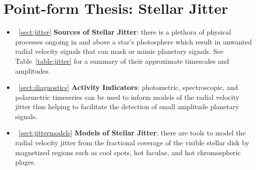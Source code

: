 \section{Point-form Thesis: Stellar Jitter}
\begin{itemize}
\renewcommand\labelitemi{--}
\item~\ref{sect:jitter} \textbf{Sources of Stellar Jitter}: there is a plethora of physical 
processes ongoing in and above a star's photosphere which result in unwanted radial velocity 
signals that can mask or mimic planetary signals. 
See Table~\ref{table:jitter} for a summary of their approximate timescales and amplitudes. 
\item~\ref{sect:diagnostics} \textbf{Activity Indicators}: photometric, 
spectroscopic, and polarmetric 
timeseries can be used to inform models of the radial velocity jitter thus helping to facilitate 
the detection of small amplitude planetary signals. 
\item~\ref{sect:jittermodels} \textbf{Models of Stellar Jitter}: there are tools to model the 
radial velocity jitter from the fractional coverage of the visible stellar disk by 
magnetized regions such as cool spots, hot faculae, and hot chromospheric plages.
\end{itemize}
